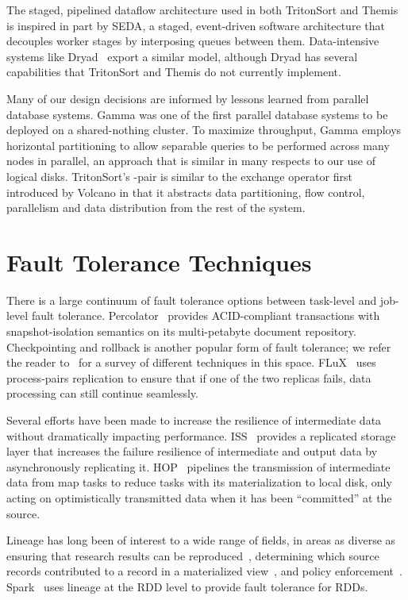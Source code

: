 The staged, pipelined dataflow architecture used in both TritonSort and Themis
is inspired in part by SEDA\cite{seda}, a staged, event-driven software
architecture that decouples worker stages by interposing queues between them.
Data-intensive systems like Dryad~\cite{dryad} export a similar model, although
Dryad has several capabilities that TritonSort and Themis do not currently
implement.

Many of our design decisions are informed by lessons learned from parallel
database systems.  Gamma\cite{gamma} was one of the first parallel database
systems to be deployed on a shared-nothing cluster.  To maximize throughput,
Gamma employs horizontal partitioning to allow separable queries to be
performed across many nodes in parallel, an approach that is similar in many
respects to our use of logical disks.  TritonSort's \sender-\receiver pair is
similar to the exchange operator first introduced by Volcano\cite{volcano} in
that it abstracts data partitioning, flow control, parallelism and data
distribution from the rest of the system.

\section{Fault Tolerance Techniques}

There is a large continuum of fault tolerance options between task-level and
job-level fault tolerance.  Percolator~\cite{percolator} provides
ACID-compliant transactions with snapshot-isolation semantics on its
multi-petabyte document repository. Checkpointing and rollback is another
popular form of fault tolerance; we refer the reader
to~\cite{Elnozahy:2002:SRP:568522.568525} for a survey of different techniques
in this space.  FLuX~\cite{flux} uses process-pairs replication to ensure that
if one of the two replicas fails, data processing can still continue seamlessly.

Several efforts have been made to increase the resilience of intermediate data
without dramatically impacting performance. ISS~\cite{ko-intermediate} provides
a replicated storage layer that increases the failure resilience of
intermediate and output data by asynchronously replicating it.  HOP~\cite{hop}
pipelines the transmission of intermediate data from map tasks to reduce tasks
with its materialization to local disk, only acting on optimistically
transmitted data when it has been ``committed'' at the source.

Lineage has long been of interest to a
wide range of fields, in areas as diverse as ensuring that research results can
be reproduced~\cite{Bose05lineageretrieval}, determining which source records
contributed to a record in a materialized view~\cite{cui_lineage}, and policy
enforcement~\cite{Xu06taint-enhancedpolicy}. Spark~\cite{spark} uses lineage at
the RDD level to provide fault tolerance for RDDs.

